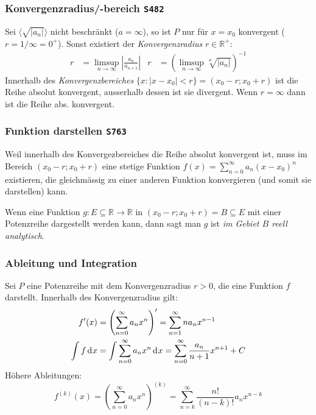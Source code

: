 \documentclass[margin=small, twocolumn]{hsrzf}
\numberwithin{equation}{subsection}
\newcommand{\brpage}[1]{\textcolor{red!70!black}{\small\texttt{S#1}}}
\begin{document}
\subsubsection{Konvergenzradius/-bereich \brpage{482}}
Sei \(\langle \sqrt{|a_n|}\rangle\) nicht beschr\"ankt (\(a = \infty\)), so ist \(P\) nur f\"ur \(x=x_0\) konvergent (\(r = 1/\infty = 0^+\)). Sonst existiert der \emph{Konvergenzradius} \(r \in\mathbb{R}^+\):
\begin{align*}
    r &= \limsup_{n\to\infty} \left| \frac{a_n}{a_{n+1}} \right| &
    r &= \left( \limsup_{n\to\infty} \sqrt[n]{| a_n |} \right)^{-1}
\end{align*}
Innerhalb des \emph{Konvergenzbereiches} \(\{ x : |x - x_0| < r\} = (x_0-r; x_0+r)\) ist die Reihe absolut konvergent, ausserhalb dessen ist sie divergent.
Wenn \(r = \infty\) dann ist die Reihe abs. konvergent.

\subsubsection{Funktion darstellen \brpage{763}}
Weil innerhalb des Konvergezbereiches die Reihe absolut konvergent ist, muss im Bereich \((x_0 - r; x_0 + r)\) eine stetige Funktion \(f(x) = \sum_{n=0}^{\infty} a_n (x - x_0)^n\) existieren, die gleichm\"assig zu einer anderen Funktion konvergieren (und somit sie darstellen) kann.

Wenn eine Funktion \(g: E \subseteq \mathbb{R} \to \mathbb{R}\) in \((x_0 - r; x_0 + r) = B \subseteq E\) mit einer Potenzreihe dargestellt werden kann, dann sagt man \(g\) ist \emph{im Gebiet \(B\) reell analytisch}.


\subsubsection{Ableitung und Integration}
Sei \(P\) eine Potenzreihe mit dem Konvergenzradius \(r > 0\), die eine Funktion \(f\) darstellt. Innerhalb des Konvergenzradius gilt:
\begin{align*}
    f'(x) &= \left(\sum_{n=0}^\infty a_n x^n \right)' 
        = \sum_{n=1}^\infty n a_n x^{n-1} \\
    \int f \,\mathrm{d}^{} x &= \int \sum_{n=0}^\infty a_n x^n \,\mathrm{d}^{} x
        = \sum_{n=0}^\infty \frac{a_n}{n+1} x^{n+1} + C
\end{align*}
H\"ohere Ableitungen:
\[
    f^{(k)}(x) = \left(\sum_{n=0}^\infty a_n x^n \right)^{(k)} 
    = \sum_{n=k}^\infty \frac{n!}{(n-k)!} a_n x^{n-k}
\]
\end{document}
